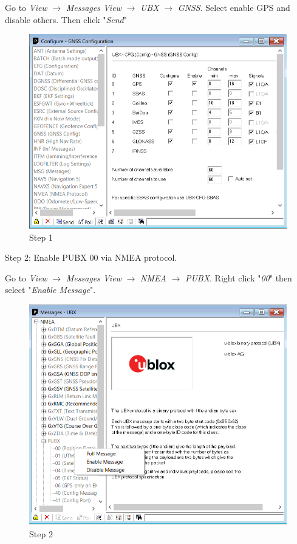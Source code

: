 Go to \emph{View} $\rightarrow$ \emph{Messages View} $\rightarrow$ \emph{UBX} $\rightarrow$ \emph{GNSS}. Select enable GPS and disable others. Then click "\emph{Send}"
\begin{figure}[H]
	\centering
	\includegraphics[scale=0.5]{./graphics/gnssset}
	\caption{Step 1 \label{fig:gnss}}
\end{figure}

Step 2: Enable PUBX 00 via NMEA protocol. 


Go to \emph{View} $\rightarrow$ \emph{Messages View} $\rightarrow$ \emph{NMEA} $\rightarrow$ \emph{PUBX}. Right click "\emph{00}" then select "\emph{Enable Message}".
\begin{figure}[H]
	\centering
	\includegraphics[scale=0.4]{./graphics/pubx00}
	\caption{Step 2 \label{fig:pubx}}
\end{figure}

